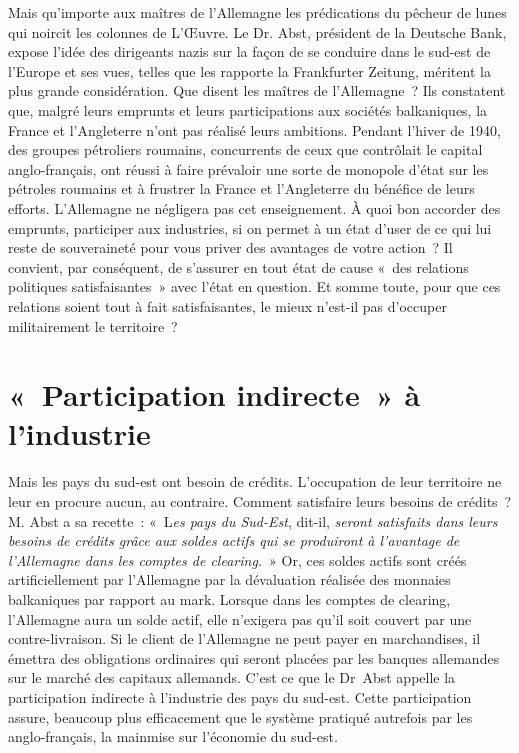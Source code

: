 \documentclass[french,twoside]{book} %
\begin{document}
Mais qu’importe aux maîtres de l’Allemagne les prédications du pêcheur de lunes qui noircit les colonnes de L’Œuvre. Le Dr. Abst, président de la Deutsche Bank, expose l’idée des dirigeants nazis sur la façon de se conduire dans le sud-est de l’Europe et ses vues, telles que les rapporte la Frankfurter Zeitung, méritent la plus grande considération. Que disent les maîtres de l’Allemagne ? Ils constatent que, malgré leurs emprunts et leurs participations aux sociétés balkaniques, la France et l’Angleterre n’ont pas réalisé leurs ambitions. Pendant l’hiver de 1940, des groupes pétroliers roumains, concurrents de ceux que contrôlait le capital anglo-français, ont réussi à faire prévaloir une sorte de monopole d’état sur les pétroles roumains et à frustrer la France et l’Angleterre du bénéfice de leurs efforts. L’Allemagne ne négligera pas cet enseignement. À quoi bon accorder des emprunts, participer aux industries, si on permet à un état d’user de ce qui lui reste de souveraineté pour vous priver des avantages de votre action ? Il convient, par conséquent, de s’assurer en tout état de cause « des relations politiques satisfaisantes » avec l’état en question. Et somme toute, pour que ces relations soient tout à fait satisfaisantes, le mieux n’est-il pas d’occuper militairement le territoire ?
\section[{« Participation indirecte » à l’industrie}]{« Participation indirecte » à l’industrie}
\noindent Mais les pays du sud-est ont besoin de crédits. L’occupation de leur territoire ne leur en procure aucun, au contraire. Comment satisfaire leurs besoins de crédits ? M. Abst a sa recette : « L\emph{es pays du Sud-Est}, dit-il, \emph{seront satisfaits dans leurs besoins de crédits grâce aux soldes actifs qui se produiront à l’avantage de l’Allemagne dans les comptes de clearing.} » Or, ces soldes actifs sont créés artificiellement par l’Allemagne par la dévaluation réalisée des monnaies balkaniques par rapport au mark. Lorsque dans les comptes de clearing, l’Allemagne aura un solde actif, elle n’exigera pas qu’il soit couvert par une contre-livraison. Si le client de l’Allemagne ne peut payer en marchandises, il émettra des obligations ordinaires qui seront placées par les banques allemandes sur le marché des capitaux allemands. C’est ce que le Dr Abst appelle la participation indirecte à l’industrie des pays du sud-est. Cette participation assure, beaucoup plus efficacement que le système pratiqué autrefois par les anglo-français, la mainmise sur l’économie du sud-est.
\end{document}
